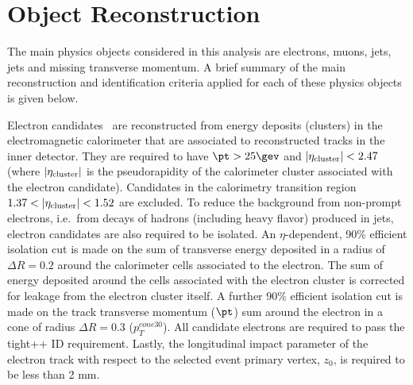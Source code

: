 \section{Object Reconstruction}
\label{sec:objectReconstruction}
The main physics objects considered in this analysis are electrons, muons,
jets, \bt jets and missing transverse momentum. A brief summary of the
main reconstruction and identification criteria applied for each
of these physics objects is given below.

Electron candidates~\cite{ElectronPerformance} are reconstructed from
energy deposits (clusters) in the electromagnetic calorimeter that are
associated to reconstructed tracks in the inner detector.  They are
required to have $\pt > 25 \gev$ and $|\eta_{\rm cluster}| < 2.47$ (where $|\eta_{\rm cluster}|$ is the
pseudorapidity of the calorimeter cluster associated with the electron
candidate).  Candidates in the calorimetry transition region $1.37 < |\eta_{\rm cluster}| < 1.52$ are excluded.  To reduce the background
from non-prompt electrons, i.e.~from decays of hadrons (including
heavy flavor) produced in jets, electron candidates are also required
to be isolated. An $\eta$-dependent, 90\% efficient isolation cut is made
on the sum of transverse energy deposited in a radius of $\Delta R = 0.2$
around the calorimeter cells associated to the electron. The sum of energy
deposited around the cells associated with the electron cluster is corrected
for leakage from the electron cluster itself.  A further 90\%
efficient isolation cut is made on the track transverse momentum
($\pt$) sum around the electron in a cone of radius $\Delta R = 0.3$ ($p_{T}^{cone30}$). All candidate electrons
are required to pass the tight++ ID requirement. Lastly, the longitudinal
impact parameter of the electron track with respect
to the selected event primary vertex, $z_{0}$, is required to be less
than 2 mm.%


